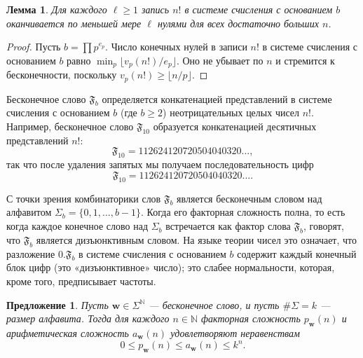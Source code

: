 \documentclass[a4paper,14pt]{extreport}
\theoremstyle{plain}
\newtheorem{lemma}{Лемма}[section]
\newtheorem{proposition}[theorem]{Предложение}
\theoremstyle{definition}
\theoremstyle{remark}
\begin{document}
\begin{lemma}\label{lem:trail}
	Для каждого $\ell\ge1$ запись $n!$ в системе счисления с основанием $b$ оканчивается по меньшей мере $\ell$ нулями для всех достаточно больших $n$.
\end{lemma}

\begin{proof}
	Пусть $b=\prod p^{e_p}$. Число конечных нулей в записи $n!$ в системе счисления с основанием $b$ равно $\min_p\lfloor v_p(n!)/e_p\rfloor$. Оно не убывает по $n$ и стремится к бесконечности, поскольку $v_p(n!)\ge\lfloor n/p\rfloor$.
\end{proof}

Бесконечное слово $\mathfrak{F}_{b}$ определяется конкатенацией представлений в системе счисления с основанием $b$ (где $b \geq 2$) неотрицательных целых чисел $n!$. Например, бесконечное слово $\mathfrak{F}_{10}$ образуется конкатенацией десятичных представлений $n!$:
\begin{equation}
	\mathfrak{F}_{10} = 1 1 2 6 24 120 720 5040 40320 \dots,
\end{equation}
так что после удаления запятых мы получаем последовательность цифр
\begin{equation}
	\mathfrak{F}_{10} = 112624120720504040320\dots.
\end{equation}

С точки зрения комбинаторики слов $\mathfrak{F}_{b}$ является бесконечным словом над алфавитом $\Sigma_{b} = \{0,1,\dots,b-1\}$. Когда его факторная сложность полна, то есть когда каждое конечное слово над $\Sigma_{b}$ встречается как фактор слова $\mathfrak{F}_{b}$, говорят, что $\mathfrak{F}_{b}$ является дизъюнктивным словом. На языке теории чисел это означает, что разложение $0.\mathfrak F_b$ в системе счисления с основанием $b$ содержит каждый конечный блок цифр (это «дизъюнктивное» число); это слабее нормальности, которая, кроме того, предписывает частоты.

\begin{proposition}\label{p03}
	Пусть $\mathbf{w} \in \Sigma^{\mathbb{N}}$ --- бесконечное слово, и пусть $\#\Sigma = k$ --- размер алфавита. Тогда для каждого $n \in \mathbb{N}$ факторная сложность $p_{\mathbf{w}}(n)$ и арифметическая сложность $a_{\mathbf{w}}(n)$ удовлетворяют неравенствам
	\begin{equation}
		0 \leq p_{\mathbf{w}}(n) \leq a_{\mathbf{w}}(n) \leq k^{n}.
	\end{equation}
\end{proposition}
\end{document}
